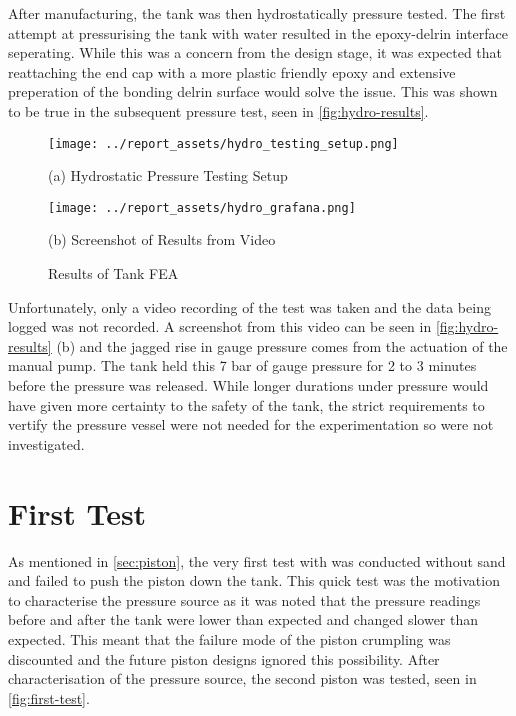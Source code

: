 After manufacturing, the tank was then hydrostatically pressure tested. The first attempt at pressurising the tank with water resulted in the epoxy-delrin interface seperating. While this was a concern from the design stage, it was expected that reattaching the end cap with a more plastic friendly epoxy and extensive preperation of the bonding delrin surface would solve the issue. This was shown to be true in the subsequent pressure test, seen in \autoref{fig:hydro-results}.
\begin{figure}[htbp]
    \centering

    \begin{minipage}{0.45\textwidth}
        \centering
        \texttt{[image: ../report\_assets/hydro\_testing\_setup.png]}
        \caption*{(a) Hydrostatic Pressure Testing Setup}
    \end{minipage}    
    \hfill
    \begin{minipage}{0.45\textwidth}
        \centering
        \texttt{[image: ../report\_assets/hydro\_grafana.png]}
        \caption*{(b) Screenshot of Results from Video}
    \end{minipage}    
    \caption{Results of Tank FEA}\label{fig:hydro-results}

\end{figure}  
Unfortunately, only a video recording of the test was taken and the data being logged was not recorded. A screenshot from this video can be seen in \autoref{fig:hydro-results} (b) and the jagged rise in gauge pressure comes from the actuation of the manual pump. The tank held this 7 bar of gauge pressure for 2 to 3 minutes before the pressure was released. While longer durations under pressure would have given more certainty to the safety of the tank, the strict requirements to vertify the pressure vessel were not needed for the experimentation so were not investigated.

\section{First Test}\label{sec:first-test}
As mentioned in \autoref{sec:piston}, the very first test with was conducted without sand and failed to push the piston down the tank. This quick test was the motivation to characterise the pressure source as it was noted that the pressure readings before and after the tank were lower than expected and changed slower than expected. This meant that the failure mode of the piston crumpling was discounted and the future piston designs ignored this possibility. After characterisation of the pressure source, the second piston was tested, seen in \autoref{fig:first-test}. 

